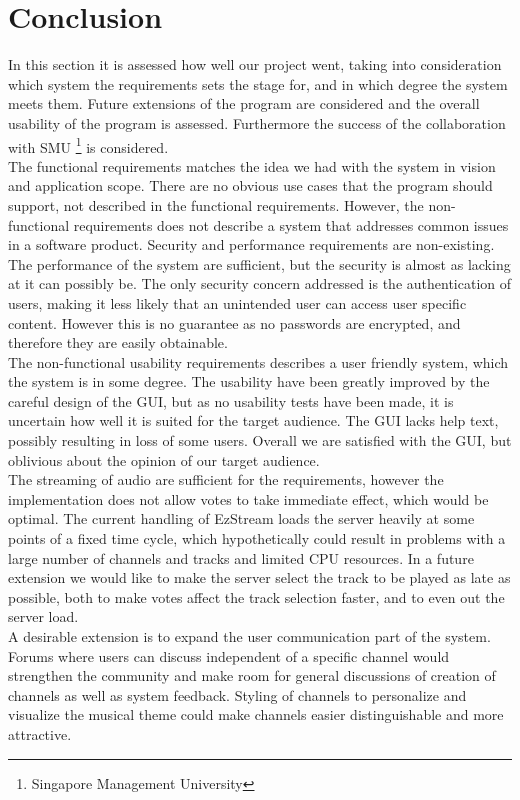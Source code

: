\documentclass[a4paper,11pt,report]{article}
\begin{document}
{\section{Conclusion}
In this section it is assessed how well our project went, taking into consideration which system the requirements sets the stage for, and in which degree the system meets them. Future extensions of the program are considered and the overall usability of the program is assessed. Furthermore the success of the collaboration with SMU \footnote{Singapore Management University} is considered. \\
The functional requirements matches the idea we had with the system in vision and application scope. There are no obvious use cases that the program should support, not described in the functional requirements. However, the non-functional requirements does not describe a system that addresses common issues in a software product. Security and performance requirements are non-existing. The performance of the system are sufficient, but the security is almost as lacking at it can possibly be. The only security concern addressed is the authentication of users, making it less likely that an unintended user can access user specific content. However this is no guarantee as no passwords are encrypted, and therefore they are easily obtainable. \\
The non-functional usability requirements describes a user friendly system, which the system is in some degree. The usability have been greatly improved by the careful design of the GUI, but as no usability tests have been made, it is uncertain how well it is suited for the target audience. The GUI lacks help text, possibly resulting in loss of some users. Overall we are satisfied with the GUI, but oblivious about the opinion of our target audience. \\
The streaming of audio are sufficient for the requirements, however the implementation does not allow votes to take immediate effect, which would be optimal. The current handling of EzStream loads the server heavily at some points of a fixed time cycle, which hypothetically could result in problems with a large number of channels and tracks and limited CPU resources. In a future extension we would like to make the server select the track to be played as late as possible, both to make votes affect the track selection faster, and to even out the server load. \\
A desirable extension is to expand the user communication part of the system. Forums where users can discuss independent of a specific channel would strengthen the community and make room for general discussions of creation of channels as well as system feedback. Styling of channels to personalize and visualize the musical theme could make channels easier distinguishable and more attractive. \\
}
\end{document}
